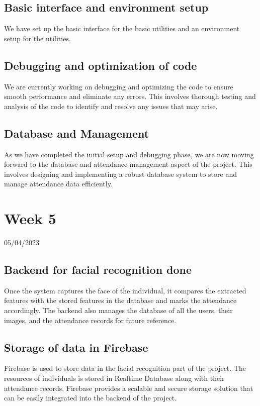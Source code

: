 \documentclass[12pt]{book}
\begin{document}
	\section{Basic interface and environment setup}
	We have set up the basic interface for the basic utilities and an environment setup for the utilities.
	\section{Debugging and optimization of code}
	We are currently working on debugging and optimizing the code to ensure smooth performance and eliminate any errors. This involves thorough testing and analysis of the code to identify and resolve any issues that may arise.
	\section{Database and Management}
	As we have completed the initial setup and debugging phase, we are now moving forward to the database and attendance management aspect of the project. This involves designing and implementing a robust database system to store and manage attendance data efficiently.
	
	
	\chapter{Week 5}
	\justifying
	\large
	05/04/2023
	
	\paragraph{}
	\section{Backend for facial recognition done}
	Once the system captures the face of the individual, it compares the extracted features with the stored features in the database and marks the attendance accordingly. The backend also manages the database of all the users, their images, and the attendance records for future reference.
	\section{Storage of data in Firebase}
	Firebase is used to store data in the facial recognition part of the project. The resources of individuals is stored in Realtime Database along with their attendance records. Firebase provides a scalable and secure storage solution that can be easily integrated into the backend of the project.
\end{document}
